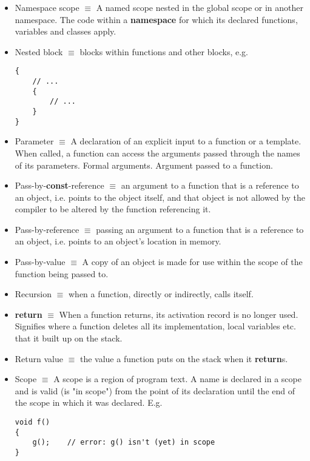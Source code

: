 \documentclass[12pt]{article}
\begin{document}
\begin{itemize}
\item Namespace scope $\equiv$ A named scope nested in the global scope or in another namespace. The code within a \textbf{namespace} for which its declared functions, variables and classes apply.

\item Nested block $\equiv$ blocks within functions and other blocks, e.g.

\begin{lstlisting}
{
	// ...
	{
		// ...
	}
}
\end{lstlisting}

\item Parameter $\equiv$ A declaration of an explicit input to a function or a template. When called, a function can access the arguments passed through the names of its parameters. Formal arguments. Argument passed to a function.

\item Pass-by-\textbf{const}-reference $\equiv$ an argument to a function that is a reference to an object, i.e. points to the object itself, and that object is not allowed by the compiler to be altered by the function referencing it.

\item Pass-by-reference $\equiv$ passing an argument to a function that is a reference to an object, i.e. points to an object's location in memory.

\item Pass-by-value $\equiv$ A copy of an object is made for use within the scope of the function being passed to.

\item Recursion $\equiv$ when a function, directly or indirectly, calls itself.

\item \textbf{return} $\equiv$ When a function returns, its activation record is no longer used. Signifies where a function deletes all its implementation, local variables etc. that it built up on the stack.

\item Return value $\equiv$ the value a function puts on the stack when it \textbf{return}s.

\item Scope $\equiv$ A scope is a region of program text. A name is declared in a scope and is valid (is "in scope") from the point of its declaration until the end of the scope in which it was declared. E.g.

\begin{lstlisting}
void f()
{
	g();	// error: g() isn't (yet) in scope
}


\end{lstlisting}
\end{itemize}
\end{document}

